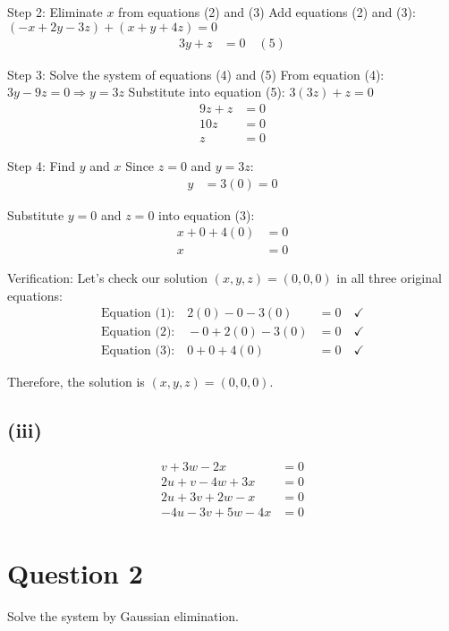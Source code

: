 \documentclass[12pt]{article}
\begin{document}
Step 2: Eliminate $x$ from equations (2) and (3)
Add equations (2) and (3): $(-x + 2y - 3z) + (x + y + 4z) = 0$
\begin{align}
3y + z &= 0 \quad (5)
\end{align}

Step 3: Solve the system of equations (4) and (5)
From equation (4): $3y - 9z = 0 \Rightarrow y = 3z$
Substitute into equation (5): $3(3z) + z = 0$
\begin{align*}
9z + z &= 0\\
10z &= 0\\
z &= 0
\end{align*}

Step 4: Find $y$ and $x$
Since $z = 0$ and $y = 3z$:
\begin{align*}
y &= 3(0) = 0
\end{align*}

Substitute $y = 0$ and $z = 0$ into equation (3):
\begin{align*}
x + 0 + 4(0) &= 0\\
x &= 0
\end{align*}

Verification: Let's check our solution $(x, y, z) = (0, 0, 0)$ in all three original equations:
\begin{align*}
\text{Equation (1):} \quad 2(0) - 0 - 3(0) &= 0 \quad \checkmark\\
\text{Equation (2):} \quad -0 + 2(0) - 3(0) &= 0 \quad \checkmark\\
\text{Equation (3):} \quad 0 + 0 + 4(0) &= 0 \quad \checkmark
\end{align*}

Therefore, the solution is $\boxed{(x, y, z) = (0, 0, 0)}$.

\subsection*{(iii)}
\begin{align*}
v + 3w - 2x &= 0\\
2u + v - 4w + 3x &= 0\\
2u + 3v + 2w - x &= 0\\
-4u - 3v + 5w - 4x &= 0
\end{align*}

\section*{Question 2}
Solve the system by Gaussian elimination.
\end{document}
